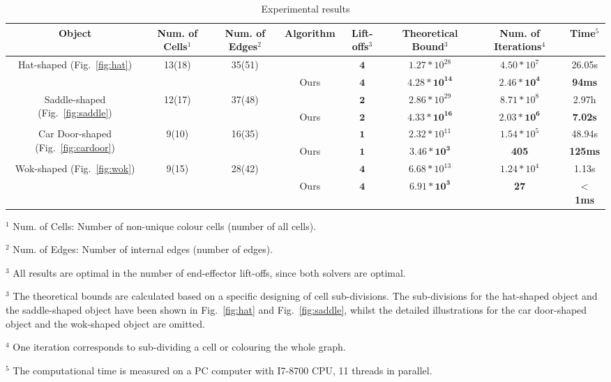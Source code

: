 \documentclass[journal]{IEEEtran}
\begin{document}
\begin{table}
\centering
\caption{Experimental results}\label{table:results}
\begin{tabular}{  c | c | c | c | c | c | c | c  }
\hline
Object & Num. of Cells$^1$& Num. of Edges$^2$ & Algorithm & Lift-offs$^3$  &  Theoretical Bound$^3$ & Num. of Iterations$^4$ & Time$^5$ \\
\hline
\hline
\multirow{2}{*}{Hat-shaped (Fig.~\ref{fig:hat})} & \multirow{2}{*}{13(18)} & \multirow{2}{*}{35(51)} & \cite{Yang2020Cellular}  & $\mathbf{4}$ & $1.27*10^{28}$  & $4.50*10^7$ & 26.05s\\
\cline{4-8}
&&& Ours & $\mathbf{4}$ & $\mathbf{4.28*10^{14}}$ & $\mathbf{2.46*10^4}$ & \textbf{94ms}\\
\hline
\multirow{2}{*}{Saddle-shaped (Fig.~\ref{fig:saddle})} & \multirow{2}{*}{12(17)} & \multirow{2}{*}{37(48)} & \cite{Yang2020Cellular} & $\mathbf{2}$ & $2.86*10^{29}$ &  $8.71*10^8$ & 2.97h \\
\cline{4-8}
&&& Ours & $\mathbf{2}$ & $\mathbf{4.33*10^{16}}$ & $\mathbf{2.03*10^6}$ & \textbf{7.02s}\\
\hline
\multirow{2}{*}{Car Door-shaped (Fig.~\ref{fig:cardoor})} & \multirow{2}{*}{9(10)} & \multirow{2}{*}{16(35)} & \cite{Yang2020Cellular} & $\mathbf{1}$ & $2.32*10^{11}$ & $1.54*10^5$ & 48.94s\\
\cline{4-8}
 & && Ours & $\mathbf{1}$ & $\mathbf{3.46*10^3}$ & \textbf{405} & \textbf{125ms}\\
\hline
\multirow{2}{*}{Wok-shaped (Fig.~\ref{fig:wok})} &\multirow{2}{*}{9(15)}&\multirow{2}{*}{28(42)} & \cite{Yang2020Cellular} & $\mathbf{4}$ & $6.68*10^{13}$ & $1.24*10^4$ & 1.13s\\
\cline{4-8}
&&& Ours & $\mathbf{4}$ & $\mathbf{6.91*10^3}$ & \textbf{27} & $\mathbf{<}$\textbf{1ms}\\
\hline
\end{tabular}
\begin{tablenotes}
\item $^1$ Num. of Cells: Number of non-unique colour cells (number of all cells). 
\item $^2$ Num. of Edges: Number of internal edges (number of edges). 
\item $^3$ All results are optimal in the number of end-effector lift-offs, since both solvers are optimal. 
\item $^3$ The theoretical bounds are calculated based on a specific designing of cell sub-divisions. The sub-divisions for the hat-shaped object and the saddle-shaped object have been shown in Fig.~\ref{fig:hat} and Fig.~\ref{fig:saddle}, whilst the detailed illustrations for the car door-shaped object and the wok-shaped object are omitted. 
\item $^4$ One iteration corresponds to sub-dividing a cell or colouring the whole graph.  
\item $^5$ The computational time is measured on a PC computer with I7-8700 CPU, 11 threads in parallel. 
\end{tablenotes}
\end{table}
\end{document}
